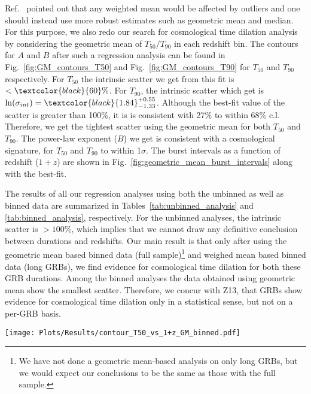 \documentclass[prd,nofootinbib,preprintnumbers,floatfix]{revtex4}  %
\newcommand{\rthis}[1]{\textcolor{black}{#1}}
\begin{document}
\begin{itemize}
\label{sec:geometric_mean_analysis}
Ref.~\cite{Butler} pointed out that any weighted mean would be affected by outliers and one should instead use more robust estimates such as geometric mean and median. For this purpose, we also redo our search for cosmological time dilation analysis by  considering the geometric mean of $T_{50}/T_{90}$ in each redshift bin. The contours for $A$ and $B$ after such a regression analysis can be found  in Fig.~\ref{fig:GM_contours_T50} and Fig.~\ref{fig:GM_contours_T90} for $T_{50}$ and  $T_{90}$ respectively. For  $T_{50}$ the intrinsic scatter we get from this fit is $<\rthis{60}\%$. For $T_{90}$,
the intrinsic scatter which get is  $\ln(\sigma_{int})=\rthis{1.84}^{+0.55}_{-1.33}$.
Although the best-fit value of the  scatter is greater than 100\%, it is is consistent with 27\% to within 68\% c.l. Therefore, we get the tightest scatter using the geometric mean for both $T_{50}$ and $T_{90}$. The power-law exponent ($B$) we get  is consistent with a cosmological signature, for  $T_{50}$ and $T_{90}$ to within 1$\sigma$. The burst intervals as a function of redshift ($1+z$) are shown  in Fig.~\ref{fig:geometric_mean_burst_intervals} along with the best-fit.
\end{itemize}

The results of all our regression analyses using  both the unbinned as well as binned data are summarized  in  Tables~\ref{tab:unbinned_analysis} and \ref{tab:binned_analysis}, respectively.
For the unbinned analyses, the intrinsic scatter is $>100$\%, which implies that we cannot draw any definitive conclusion between durations and redshifts.
Our main result is that only after using the geometric mean based binned data  (full sample)\footnote{We have not done a  geometric mean-based analysis on only long GRBs, but we would expect our conclusions to be the same as those with the full sample.} and weighed mean based binned data (long GRBs),   we find evidence for cosmological time dilation for both these GRB durations. Among the binned analyses the data obtained using geometric mean show the smallest scatter.  Therefore, we concur with Z13, that GRBs show evidence for cosmological time dilation only in a statistical sense, but not on a per-GRB basis. 
\begin{figure*}
    \centering
    \texttt{[image: Plots/Results/contour\_T50\_vs\_1+z\_GM\_binned.pdf]}
    \caption{Contours for 68\%, 90\%, and 95\% credible intervals $T_{50}$  in the rest frame energy range of 140-350 keV, using binned data where the geometric mean of $T_{50}$ in each bin was used. The intrinsic scatter ($\sigma_{int}$) is very low,
    indicating that there is a deterministic  relationship between binned durations and the redshifts. The value of $B$ is consistent with the cosmological time dilation signature. }
    \label{fig:GM_contours_T50}
\end{figure*}
\end{document}
